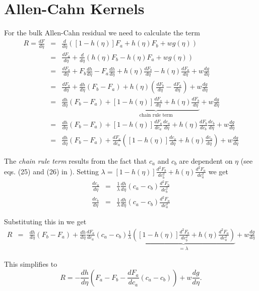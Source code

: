 \documentclass[]{article}
\begin{document}
\section{Allen-Cahn  Kernels}

For the bulk Allen-Cahn residual we need to calculate the term 
\begin{eqnarray*}
R=\frac{dF}{d\eta}&=&\frac{d}{d\eta}\left([1-h(\eta)]F_a + h(\eta)F_b+wg(\eta) \right)\\
&=& \frac{dF_a}{d\eta}+\frac{d}{d\eta}\left(h(\eta)F_b-h(\eta)F_a + wg(\eta)\right)\\
&=& \frac{dF_a}{d\eta}+F_b\frac{dh}{d\eta}-F_a\frac{dh}{d\eta}+h(\eta)\frac{dF_b}{d\eta}-h(\eta)\frac{dF_a}{d\eta} +w\frac{dg}{d\eta}\\
&=& \frac{dF_a}{d\eta}+\frac{dh}{d\eta}(F_b-F_a)+h(\eta)\left(\frac{dF_b}{d\eta}-\frac{dF_a}{d\eta}\right) +w\frac{dg}{d\eta}\\
&=& \frac{dh}{d\eta}(F_b-F_a) + \underbrace{[1-h(\eta)]\frac{dF_a}{d\eta} + h(\eta)\frac{dF_b}{d\eta}}_{\text{chain rule term}} +w\frac{dg}{d\eta}\\
&=& \frac{dh}{d\eta}(F_b-F_a) + [1-h(\eta)]\frac{dF_a}{dc_a}\frac{dc_a}{d\eta} + h(\eta)\frac{dF_b}{dc_b}\frac{dc_b}{d\eta} +w\frac{dg}{d\eta}\\
&=& \frac{dh}{d\eta}(F_b-F_a) + \frac{dF_a}{dc_a}\left([1-h(\eta)]\frac{dc_a}{d\eta} + h(\eta)\frac{dc_b}{d\eta}\right) +w\frac{dg}{d\eta}
\end{eqnarray*}

The \emph{chain rule term} results from the fact that $c_a$ and $c_b$ are dependent on $\eta$ (see eqs. (25) and (26) in \cite{KKS}).
Setting $\lambda = [1-h(\eta)]\frac{d^2F_b}{dc_b^2}+h(\eta)\frac{d^2F_a}{dc_a^2}$ we get
\begin{eqnarray*}
\frac{dc_a}{d\eta} &=& \frac1\lambda \frac{dh}{d\eta}(c_a-c_b)\frac{d^2F_b}{dc_b^2}\\
\frac{dc_b}{d\eta} &=& \frac1\lambda \frac{dh}{d\eta}(c_a-c_b)\frac{d^2F_a}{dc_a^2}
\end{eqnarray*}

Substituting this in we get
\begin{eqnarray*}
R &=& \frac{dh}{d\eta}(F_b-F_a) + \frac{dh}{d\eta}\frac{dF_a}{dc_a}(c_a-c_b)\frac1\lambda\underbrace{\left([1-h(\eta)] \frac{d^2F_b}{dc_b^2} + h(\eta)\frac{d^2F_a}{dc_a^2}\right)}_{=\lambda} +w\frac{dg}{d\eta}
\end{eqnarray*}

This simplifies to
\[
R=-\frac{dh}{d\eta} \left(F_a-F_b-\frac{dF_a}{dc_a}(c_a-c_b)\right) + w\frac{dg}{d\eta}.
\]
\end{document}
